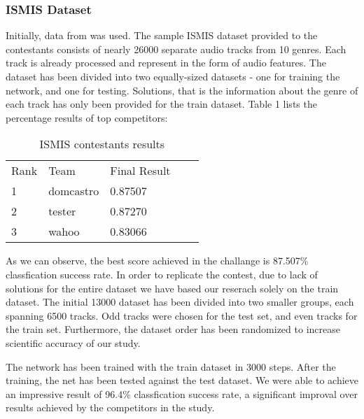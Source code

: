 \subsubsection{ISMIS Dataset}
 Initially, data from \cite{data} was used. The sample ISMIS dataset provided to the contestants consists of nearly 26000 separate audio tracks from 10 genres. Each track is already processed and represent in the form of audio features. The dataset has been divided into two equally-sized datasets - one for training the network, and one for testing. Solutions, that is the information about the genre of each track has only been provided for the train dataset. Table 1 lists the percentage results of top competitors:
\begin{table}[h]
	\centering
	\caption{ISMIS contestants results}
	\label{my-label}
	\begin{tabular}{|l|l|l|ll}
		\cline{1-3}
		Rank & Team      & Final Result &  &  \\ \cline{1-3}
		1    & domcastro & 0.87507      &  &  \\ \cline{1-3}
		2    & tester    & 0.87270      &  &  \\ \cline{1-3}
		3    & wahoo     & 0.83066      &  &  \\ \cline{1-3}
	\end{tabular}
\end{table}

As we can observe, the best score achieved in the challange is 87.507\% classfication success rate. 
In order to replicate the contest, due to lack of solutions for the entire dataset we have based our reserach solely on the train dataset. The initial 13000 dataset has been divided into two smaller groups, each spanning 6500 tracks. Odd tracks were chosen for the test set, and even tracks for the train set. Furthermore, the dataset order has been randomized to increase scientific accuracy of our study. 

The network has been trained with the train dataset in 3000 steps. After the training, the net has been tested against the test dataset. We were able to achieve an impressive result of 96.4\% classfication success rate, a significant improval over results achieved by the competitors in the study. 

